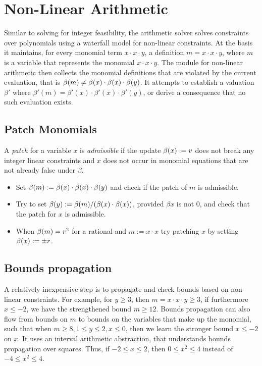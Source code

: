 \section{Non-Linear Arithmetic}
\label{sec:nla}

Similar to solving for integer feasibility, the arithmetic solver
solves constraints over polynomials using a waterfall model for non-linear
constraints.
At the basis it maintains, for every monomial 
term $x \cdot x \cdot y$, a definition
$m = x \cdot x \cdot y$, where $m$ is a variable
that represents the monomial $x \cdot x \cdot y$.
The module for non-linear arithmetic then collects the monomial
definitions that are violated by the current evaluation,
that is $\beta(m) \neq \beta(x) \cdot \beta(x) \cdot \beta(y)$. It  attempts to 
establish a valuation $\beta'$ where $\beta'(m) = \beta'(x) \cdot \beta'(x) \cdot \beta'(y)$, 
or derive a consequence that no such evaluation exists.



\subsection{Patch Monomials}

A \emph{patch} for a variable $x$ is \emph{admissible} if the update $\beta(x) := v$
does not break any integer linear constraints and $x$ does not occur in monomial
equations that are not already false under $\beta$.

\begin{itemize}
\item Set $\beta(m) := \beta(x) \cdot \beta(x) \cdot \beta(y)$ and check if the patch of $m$ is admissible.
\item Try to set $\beta(y) := \beta(m) / (\beta(x) \cdot \beta(x))$, provided $\beta{x}$ is not 0,
  and check that the patch for $x$ is admissible.
\item When $\beta(m) = r^2$ for a rational and $m := x \cdot x$ try patching $x$ by setting $\beta(x) := \pm r$.
\end{itemize}


\subsection{Bounds propagation}
A relatively inexpensive step is to propagate and check bounds based 
on non-linear constraints. For example, for $y \geq 3$, then $m = x\cdot x\cdot y \geq 3$,
if furthermore $x \leq -2$, we have the strengthened bound $m \geq 12$.
Bounds propagation can also flow from bounds on $m$ to bounds on the 
variables that make up the monomial, such that when $m \geq 8, 1 \leq y \leq 2, x \leq 0$, 
then we learn the stronger bound $x \leq -2$ on $x$. It uses an interval arithmetic abstraction,
that understands bounds propagation over squares. Thus, if $-2 \leq x \leq 2$, then $0 \leq x^2 \leq 4$
instead of $-4 \leq x^2 \leq 4$.

